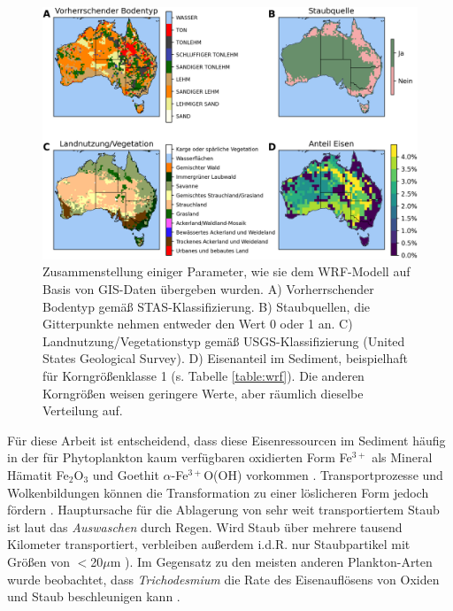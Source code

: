 \documentclass[12pt,a4paper,onecolumn]{scrartcl}
\begin{document}
\begin{figure}[!htb]
\includegraphics[width=\textwidth]{bilder/soil_type_iron.png}
\caption{Zusammenstellung einiger Parameter, wie sie dem WRF-Modell auf Basis von GIS-Daten übergeben wurden. A) Vorherrschender Bodentyp gemäß STAS-Klassifizierung. B) Staubquellen, die Gitterpunkte nehmen entweder den Wert 0 oder 1 an. C) Landnutzung/Vegetationstyp gemäß USGS-Klassifizierung (United States Geological Survey). D) Eisenanteil im Sediment, beispielhaft für Korngrößenklasse 1 (s. Tabelle \ref{table:wrf}). Die anderen Korngrößen weisen geringere Werte, aber räumlich dieselbe Verteilung auf.} \label{fig:soil_type_iron}
\end{figure}
Für diese Arbeit ist entscheidend, dass diese Eisenressourcen im Sediment häufig in der für Phytoplankton kaum verfügbaren oxidierten Form Fe$^{3+}$ als Mineral Hämatit Fe$_2$O$_3$ und Goethit $\alpha$-Fe$^{3+}$O(OH) vorkommen \citep{Reynolds.2014}. Transportprozesse und Wolkenbildungen können die Transformation zu einer löslicheren Form jedoch fördern \citep{Shao.2011}. Hauptursache für die Ablagerung von sehr weit transportiertem Staub ist laut \citet{Marx.2018} das \textit{Auswaschen} durch Regen. Wird Staub über mehrere tausend Kilometer transportiert, verbleiben außerdem  i.d.R. nur Staubpartikel mit Größen von $<$20$\mu$m \citep{Marx.2018}). Im Gegensatz zu den meisten anderen Plankton-Arten wurde beobachtet, dass \textit{Trichodesmium} die Rate des Eisenauflösens von Oxiden und Staub beschleunigen kann \citep{Rubin.2011}.
\end{document}
